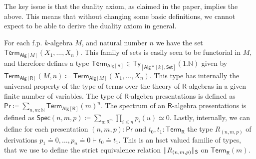 \documentclass[10pt,a4paper]{article}
\theoremstyle{definition}
\theoremstyle{remark}
\newcommand{\nats}{\mathbb{N}}
\newcommand{\Set}{\mathsf{Set}}
\newcommand{\Alg}{\mathsf{Alg}}
\newcommand\Ty{\mathsf{Ty}}
\newcommand\R{\mathsf{R}}
\newcommand\Spec{\mathsf{Spec}}
\renewcommand\Pr{\mathsf{Pr}}
\newcommand\Term{\mathsf{Term}}
\begin{document}
The key issue is that the duality axiom, as claimed in the paper, implies the above.
This means that without changing some basic definitions, we cannot expect to be able to derive the duality axiom in general.

For each f.p. \(k\)-algebra \(M\), and natural number \(n\) we have the set \(\Term_{\Alg[M]}(X_1, \ldots, X_n)\).
This family of sets is easily seen to be functorial in \(M\), and therefore defines a type \(\Term_{\Alg[\R]} \in \Ty_{[\Alg*[k], \Set]}(1.\nats)\) given by \(\Term_{\Alg[\R]}(M, n) \coloneqq \Term_{\Alg[M]}(X_1, \ldots, X_n)\).
This type has internally the universal property of the type of terms over the theory of \(\R\)-algebras in a given finite number of variables.
The type of \(\R\)-algebra presentations is defined as \(\Pr \coloneqq \sum_{n, m \colon \nats} \Term_{\Alg[\R]}(m)^n\). 
The spectrum of an \(\R\)-algebra presentations is defined as \(\Spec(n, m, p) \coloneqq \sum_{ u \colon \R^{m} } \prod_{i \leq n} p_i(u) \simeq 0\).
Lastly, internally, we can define for each presentation \((n, m, p) \colon \Pr\) and \(t_0, t_1 \colon \Term_{\R}\) the type \(R_{(n,m,p)}\) of derivations \(p_1 \doteq 0, \ldots, p_n \doteq 0 \vdash t_0 \doteq t_1\).
This is an hset valued familie of types, that we use to define the strict equivalence relation \(\trunc*{R_{(n,m,p)}}\) on \(\Term_{\R}(m)\).
\end{document}
